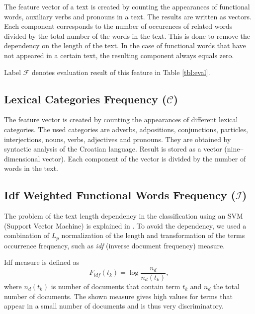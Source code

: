 \documentclass{llncs}
\begin{document}
The feature vector of a text is created by counting the appearances
of functional words, auxiliary verbs and pronouns in a text. The results
are written as vectors. Each component corresponds to the number of occurences of
related words divided by the total number of the words in the text. This is done
to remove the dependency on the length of the text. In the case of functional words that
have not appeared in a certain text, the resulting component always equals zero.

Label $\mathcal{F}$ denotes evaluation result of this feature in Table
\ref{tbl:eval}.

\subsection{Lexical Categories Frequency ($\mathcal{C}$)}
\label{sec:rijeci-grupe}
The feature vector is created by counting the appearances of
different lexical categories. The used categories are adverbs,
adpositions, conjunctions, particles, interjections, nouns, verbs, adjectives and
pronouns. They are obtained by syntactic analysis of the Croatian language. Result is
stored as a vector (nine--dimensional vector). Each component of the vector
is divided by the number of words in the text.

\subsection{Idf Weighted Functional Words Frequency ($\mathcal{I}$)}
\label{sec:funkcijske-rijeci-idf}
The problem of the text length dependency in the classification using
an SVM (Support Vector Machine) is explained in \cite{diederich2003authorship}.
To avoid the dependency, we used a combination of $L_p$ normalization of the
length and transformation of the terms occurrence frequency, such as \emph{idf}
(inverse document frequency) measure.

Idf measure is defined as \cite{diederich2003authorship}
\begin{equation}
F_{idf}(t_k) = \log \frac{n_d}{n_d(t_k)},
\label{equ:idf}
\end{equation}
where $n_d(t_k)$ is number of documents that contain term $t_k$ and
$n_d$ the total number of documents. The shown measure gives high values for terms
that appear in a small number of documents and is thus very discriminatory.
\end{document}
